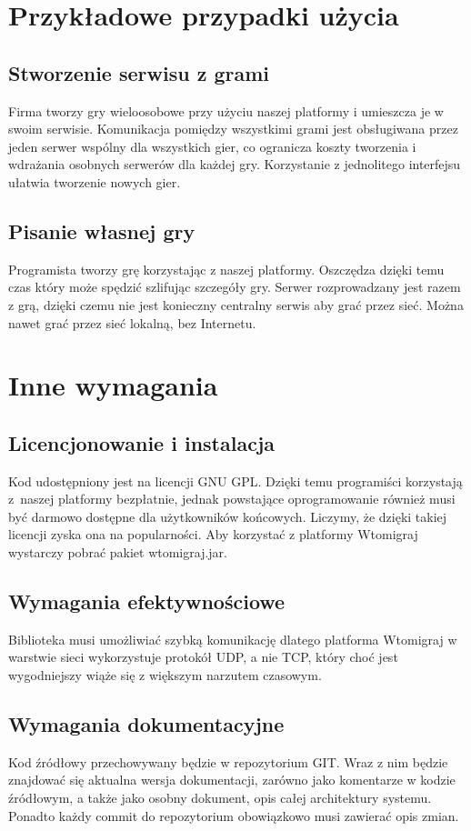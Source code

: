 \documentclass[a4paper, 12pt]{article}
\begin{document}
\section[Przykładowe przypadki użycia]{Przykładowe przypadki użycia}
\subsection{Stworzenie serwisu z grami} Firma tworzy gry wieloosobowe przy użyciu naszej platformy i umieszcza je w swoim serwisie. Komunikacja pomiędzy wszystkimi grami jest obsługiwana przez jeden serwer wspólny dla wszystkich gier, co ogranicza koszty tworzenia i wdrażania osobnych serwerów dla każdej gry. Korzystanie z jednolitego interfejsu ułatwia tworzenie nowych gier.
\subsection{Pisanie własnej gry} Programista tworzy grę korzystając z naszej platformy. Oszczędza dzięki temu czas który może spędzić szlifując szczegóły gry. Serwer rozprowadzany jest razem z grą, dzięki czemu nie jest konieczny centralny serwis aby grać przez sieć. Można nawet grać przez sieć lokalną, bez Internetu.

\section{Inne wymagania}
\subsection{Licencjonowanie i instalacja}
Kod udostępniony jest na licencji GNU GPL. Dzięki temu programiści korzystają z~naszej platformy bezpłatnie, jednak powstające oprogramowanie również musi być darmowo dostępne dla użytkowników końcowych. Liczymy, że dzięki takiej licencji zyska ona na popularności. Aby korzystać z platformy Wtomigraj wystarczy pobrać pakiet wtomigraj.jar. 


\subsection{Wymagania efektywnościowe}
Biblioteka musi umożliwiać szybką komunikację dlatego platforma Wtomigraj w warstwie sieci wykorzystuje protokół UDP, a nie TCP, który choć jest wygodniejszy wiąże się z większym narzutem czasowym.

\subsection[Wymagania dokumentacyjne]{Wymagania dokumentacyjne}
Kod źródłowy przechowywany będzie w repozytorium GIT. Wraz z nim będzie znajdować się aktualna wersja dokumentacji, zarówno jako komentarze w kodzie źródłowym, a także jako osobny dokument, opis całej architektury systemu. Ponadto każdy commit do repozytorium obowiązkowo musi zawierać opis zmian.
\end{document}
